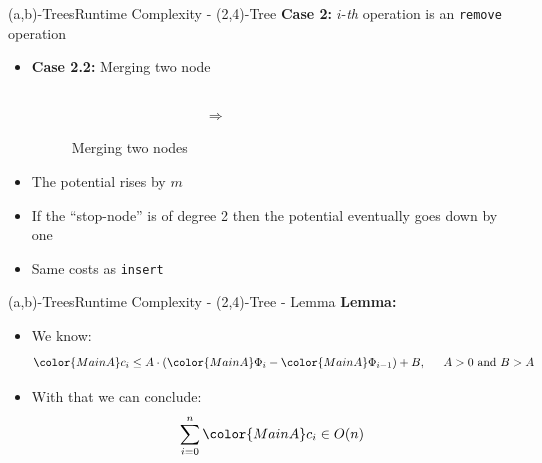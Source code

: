 \begin{frame}{(a,b)-Trees}{Runtime Complexity - (2,4)-Tree}
  \textbf{Case 2:}
  {\color{MainA}$i$}-\textit{th} operation is an
  \texttt{\color{MainA}remove} operation
  \begin{itemize}
    \item
      \textbf{Case 2.2:} Merging two node
      \begin{figure}
        \begin{columns}
          \begin{column}{0.35\linewidth}
            \begin{adjustbox}{width=\linewidth}
              
            \end{adjustbox}
          \end{column}
          \begin{column}{0.1\linewidth}
            \begin{center}
              $\Rightarrow$
            \end{center}
          \end{column}
          \begin{column}{0.35\linewidth}
            \begin{adjustbox}{width=0.85\linewidth}
              
            \end{adjustbox}
          \end{column}
        \end{columns}
        \caption{Merging two nodes}
        \label{fig:a_b_tree:merge_potential2}
      \end{figure}
    \item<2->
      The potential rises by {\color{MainA}$m$}
    \item<3->
      If the \enquote{stop-node} is of {\color{MainA}degree 2} then the
      potential eventually goes down by one
    \item<4->
      Same costs as \texttt{\color{MainA}insert}
  \end{itemize}
\end{frame}


\begin{frame}{(a,b)-Trees}{Runtime Complexity - (2,4)-Tree - Lemma}
  \textbf{Lemma:}
  \begin{itemize}
    \item<2->
      We know:
      \begin{displaymath}
      {\color{MainA}c_i} \leq A \cdot \left(
      {\color{MainA}\Phi_i} - {\color{MainA}\Phi_{i-1}}
      \right) + B, \hspace{1.5em} A > 0 \text{ and } B > A
      \end{displaymath}
    \item<3->
      With that we can conclude:
      \begin{displaymath}
        \sum_{i=0}^{n} {\color{MainA}c_i} \in O(n)
      \end{displaymath}
  \end{itemize}
\end{frame}

